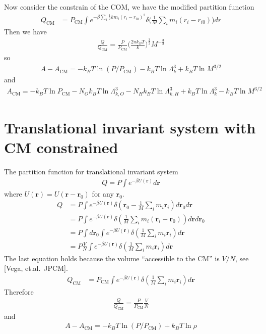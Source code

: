 \documentclass[aps,pre,a4paper,showkeys,fleqn]{revtex4}
\newcommand{\com}[0]{{\textrm{CM}}}
\begin{document}
Now consider the constrain of the COM, we have the modified partition function
\begin{align*}
  Q_\com
  &= 
    {P_\com}
    \int e^{-\beta\sum_i \frac 12km_i(r_i - r_{i0})^2} \delta\big(\frac1M\sum_i m_i(r_i -  r_{i0})\big) dr 
\end{align*}
Then we have
\begin{align}
  \frac{Q}{Q_\com} = \frac{P}{P_\com}\Big( \frac{2\pi k_BT}k  \Big)^{\frac32} M^{-\frac32}
\end{align}
so
\begin{align}
  A - A_\com = -k_BT \ln(P/P_\com) - k_BT \ln \Lambda_k^3 + k_BT \ln M^{3/2} 
\end{align}
and
\begin{align}\label{eqn:10}
  A_\com =
  -k_BT \ln P_\com
  - N_O k_BT \ln \Lambda_{k,O}^3
  - N_H k_BT \ln \Lambda_{k,H}^3
  + k_BT\ln \Lambda_k^3 - k_BT \ln M^{3/2}
\end{align}



\section{Translational invariant system with CM constrained}
The partition function for translational invariant system
\begin{align*}
  Q = P \int e^{-\beta U(\bm r)}d \bm r
\end{align*}
where $U(\bm r) = U(\bm r - \bm r_0)$ for any $\bm r_0$.
\begin{align*}
  Q
  &=
    P \int e^{-\beta U(\bm r)} \delta(\bm r_0 - \frac1M\sum_i m_i \bm r_i) d\bm r_0 d\bm r \\
  &=
    P \int e^{-\beta U(\bm r)} \delta(\frac1M\sum_i m_i (\bm r_i - \bm r_0)) d\bm r d\bm r_0 \\
  &=
    P\int d\bm r_0 \int e^{-\beta U(\bm r)} \delta(\frac1M\sum_i m_i \bm r_i) d\bm r\\
  &=
    P\frac{V}{N} \int e^{-\beta U(\bm r)} \delta(\frac1M\sum_i m_i \bm r_i) d\bm r
\end{align*}
The last equation holds because the volume ``accessible to the CM'' is $V/N$, see [Vega, et.al.~JPCM].
\begin{align*}
  Q_\com
  &=
    P_\com\int e^{-\beta U(\bm r)} \delta(\frac1M\sum_i m_i \bm r_i) d\bm r
\end{align*}
Therefore
\begin{align*}
  \frac{Q}{Q_\com} = \frac{P}{P_\com}\frac{V}{N}
\end{align*}
and
\begin{align}
  A - A_\com = -k_BT\ln(P / P_\com) + k_BT\ln \rho
\end{align}
\end{document}
